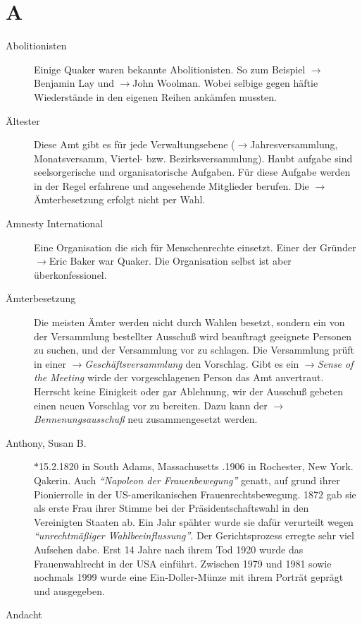 \section*{A}

\articlesize
\begin{description}

 \item[Abolitionisten] Einige Quaker waren bekannte Abolitionisten. So zum Beispiel $\to$Benjamin Lay und $\to$John Woolman. Wobei selbige gegen häftie Wiederstände in den eigenen Reihen ankämfen mussten.

 \item[Ältester] Diese Amt gibt es für jede Verwaltungsebene ($\to$Jahresversammlung, Monatsversamm, Viertel- bzw. Bezirksversammlung). Haubt aufgabe sind seelsorgerische und organisatorische Aufgaben. Für diese Aufgabe werden in der Regel erfahrene und angesehende Mitglieder berufen. Die $\to$Ämterbesetzung erfolgt nicht per Wahl.

 \item[Amnesty International] Eine Organisation die sich für Menschenrechte einsetzt. Einer der Gründer $\to$Eric Baker war Quaker. Die Organisation selbst ist aber überkonfessionel.

 \item[Ämterbesetzung]  Die meisten Ämter werden nicht durch Wahlen besetzt, sondern ein von der Versammlung bestellter Ausschuß wird beauftragt geeignete Personen zu suchen, und der Versammlung vor zu schlagen. Die Versammlung prüft in einer $\to$\textit{Geschäftsversammlung} den Vorschlag. Gibt es ein $\to$\textit{Sense of the Meeting} wirde der vorgeschlagenen Person das Amt anvertraut. Herrscht keine Einigkeit oder gar Ablehnung, wir der Ausschuß gebeten einen neuen Vorschlag vor zu bereiten. Dazu kann der $\to$\textit{Bennenungsausschuß} neu zusammengesetzt werden.

 \item[Anthony, Susan B.] $\ast$15.2.1820 in South Adams, Massachusetts .1906 in Rochester, New York. Qakerin. Auch \textit{"`Napoleon der Frauenbewegung"'} genatt, auf grund ihrer Pionierrolle in der US-amerikanischen Frauenrechtsbewegung. 1872 gab sie als erste Frau ihrer Stimme bei der Präsidentschaftswahl in den Vereinigten Staaten ab. Ein Jahr spähter wurde sie dafür verurteilt wegen \textit{"`unrechtmäßiger Wahlbeeinflussung"'}. Der Gerichtsprozess erregte sehr viel Aufsehen dabe. Erst 14 Jahre nach ihrem Tod 1920 wurde das Frauenwahlrecht in der USA einführt. Zwischen 1979 und 1981 sowie nochmals 1999 wurde eine Ein-Doller-Münze mit ihrem Porträt geprägt und ausgegeben.





 \item[Andacht]

 \end{description}
\normalsize
